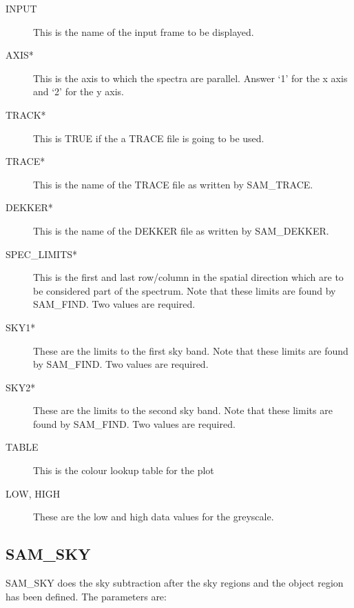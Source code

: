 \begin{description}

\item[INPUT] This is the name of the input frame to be displayed.

\item[AXIS*] This is the axis to which the spectra are parallel.  Answer `1'
for the x axis and `2' for the y axis.

\item[TRACK*] This is TRUE if the a TRACE file is going to be used.

\item[TRACE*] This is the name of the TRACE file as written by SAM\_TRACE.

\item[DEKKER*] This is the name of the DEKKER file as written by SAM\_DEKKER.

\item[SPEC\_LIMITS*] This is the first and last row/column in the spatial
direction which are to be considered part of the spectrum.  Note that these
limits are found by SAM\_FIND. Two values are required.

\item[SKY1*] These are the limits to the first sky band.  Note that these
limits are found by SAM\_FIND.  Two values are required.

\item[SKY2*] These are the limits to the second sky band.  Note that these
limits are found by SAM\_FIND.  Two values are required.

\item[TABLE] This is the colour lookup table for the plot

\item[LOW, HIGH] These are the low and high data values for the greyscale.

\end{description}

\subsection{SAM\_SKY}

SAM\_SKY does the sky subtraction after the sky regions and the object region
has been defined.  The parameters are:

